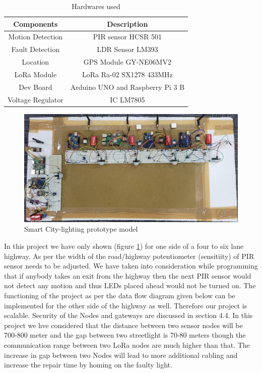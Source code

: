 \documentclass[11pt, oneside]{article}   	%
\begin{document}
\begin{table}[h]
    \centering
    \begin{tabular}{|c|c|}
    \hline
    \textbf{Components} &  \textbf{Description}\\

    \hline
     Motion Detection & PIR sensor HCSR 501\\
     \hline        
    Fault Detection  &  LDR Sensor LM393 \\
    \hline
    Location         &   GPS Module GY-NE06MV2 \\
    \hline
    LoRa Module	& LoRa Ra-02 SX1278 433MHz\\
    \hline
    Dev Board	& Arduino UNO and Raspberry Pi 3 B \\
    \hline
    Voltage Regulator	& IC LM7805 \\
    \hline
    \end{tabular}
    \caption{Hardwares used}
    \label{tab:hardware}
\end{table}

 \begin{figure}[!h]
\centering
\includegraphics[scale=0.35]{images/complete_project_image.jpeg}
\caption{\centering Smart City-lighting prototype model}
\label{complete_model}
\end{figure}

In this project we have only shown (figure \ref{complete_model}) for one side of a four to six lane highway. As per the width of the road/highway potentiometer (sensitiity) of PIR sensor needs to be adjusted. We have taken into consideration while programming that if anybody takes an exit from the highway then the next PIR sensor would not detect any motion and thus LEDs placed ahead would not be turned on. The functioning of the project as per the data flow diagram given below can be implemented for the other side of the highway as well. Therefore our project is scalable. Security of the Nodes and gateways are discussed in section 4.4. In this project we hve considered that the distance between two sensor nodes will be 700-800 meter and the gap between two streetlight is 70-80 meters though the communication range between two LoRa nodes are much higher than that. The increase in gap between two Nodes will lead to more additional cabling and increase the repair time by homing on the faulty light.
\end{document}
